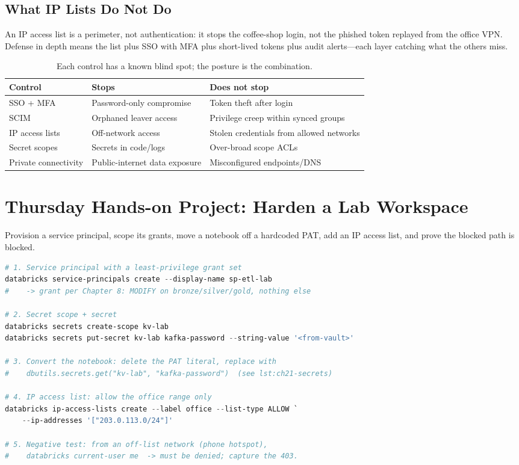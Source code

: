 \subsection{What IP Lists Do Not Do}
An IP access list is a perimeter, not authentication: it stops the coffee-shop login, not the phished token replayed from the office VPN. Defense in depth means the list plus SSO with MFA plus short-lived tokens plus audit alerts---each layer catching what the others miss.

\begin{table}[H]
\centering
\small
\begin{tabular}{@{}p{3.4cm}p{4.6cm}p{4.8cm}@{}}
\toprule
\textbf{Control} & \textbf{Stops} & \textbf{Does not stop} \\
\midrule
SSO + MFA & Password-only compromise & Token theft after login \\
SCIM & Orphaned leaver access & Privilege creep within synced groups \\
IP access lists & Off-network access & Stolen credentials from allowed networks \\
Secret scopes & Secrets in code/logs & Over-broad scope ACLs \\
Private connectivity & Public-internet data exposure & Misconfigured endpoints/DNS \\
\bottomrule
\end{tabular}
\caption{Each control has a known blind spot; the posture is the combination.}
\label{tab:ch21-controls}
\end{table}

\section{Thursday Hands-on Project: Harden a Lab Workspace}
Provision a service principal, scope its grants, move a notebook off a hardcoded PAT, add an IP access list, and prove the blocked path is blocked.

\begin{lstlisting}[language=PowerShell,caption={Week 21 lab: principal, scope, and perimeter.},label={lst:ch21-lab}]
# 1. Service principal with a least-privilege grant set
databricks service-principals create --display-name sp-etl-lab
#    -> grant per Chapter 8: MODIFY on bronze/silver/gold, nothing else

# 2. Secret scope + secret
databricks secrets create-scope kv-lab
databricks secrets put-secret kv-lab kafka-password --string-value '<from-vault>'

# 3. Convert the notebook: delete the PAT literal, replace with
#    dbutils.secrets.get("kv-lab", "kafka-password")  (see lst:ch21-secrets)

# 4. IP access list: allow the office range only
databricks ip-access-lists create --label office --list-type ALLOW `
    --ip-addresses '["203.0.113.0/24"]'

# 5. Negative test: from an off-list network (phone hotspot),
#    databricks current-user me  -> must be denied; capture the 403.
\end{lstlisting}

